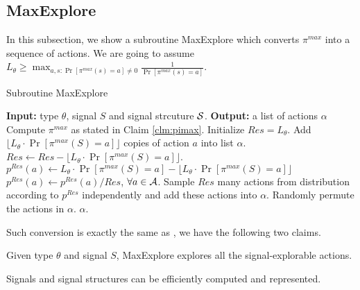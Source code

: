 \subsection{MaxExplore}
\label{sec:public_maxe}

In this subsection, we show a subroutine MaxExplore which converts $\pi^{max}$ into a sequence of actions. We are going to assume $L_{\theta} \geq \max_{a,s: \Pr[\pi^{max}(s)=a] \neq 0} \frac{1}{\Pr[\pi^{max}(s)=a]}$.
 \begin{algorithm}[H]
    \caption{Subroutine MaxExplore}
    	\label{alg:public_explore}
    \begin{algorithmic}[1]
	\STATE \textbf{Input:} type $\theta$, signal $S$ and signal strcuture $\S$.
	\STATE \textbf{Output:} a list of actions $\alpha$
	\STATE Compute $\pi^{max}$ as stated in Claim \ref{clm:pimax}.
		\STATE Initialize $Res = L_{\theta}$.
                     		\STATE Add $\lfloor L_{\theta} \cdot \Pr[\pi^{max}(S) = a]\rfloor$ copies of action $a$ into list $\alpha$.
			\STATE $Res \leftarrow Res -\lfloor L_{\theta} \cdot \Pr[\pi^{max}(S) = a] \rfloor $.
			\STATE $p^{Res}(a)\leftarrow  L_{\theta} \cdot \Pr[\pi^{max}(S) = a] -  \lfloor L_{\theta} \cdot \Pr[\pi^{max}(S) = a]\rfloor$
		\ENDFOR
		\STATE $p^{Res}(a) \leftarrow p^{Res}(a) / Res$, $\forall a \in \A$.
		\STATE Sample $Res$ many actions from distribution according to $p^{Res}$ independently and add these actions into $\alpha$.
		\STATE Randomly permute the actions in $\alpha$.
	\RETURN $\alpha$.	
     \end{algorithmic}
\end{algorithm}

Such conversion is exactly the same as \cite{ICexplorationGames-ec16-working}, we have the following two claims.

\begin{claim}
\label{clm:maxexplore}
Given type $\theta$ and signal $S$, MaxExplore explores all the signal-explorable actions.
\end{claim}

\begin{claim}
Signals and signal structures can be efficiently computed and represented.
\end{claim}

